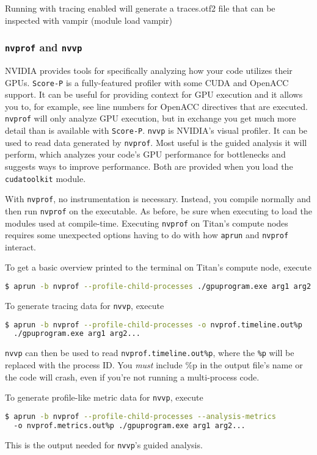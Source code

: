 Running with tracing enabled will generate a traces.otf2 file that can be
inspected with vampir (module load vampir)

\subsubsection{{\tt nvprof} and {\tt nvvp}}

NVIDIA provides tools for specifically analyzing how your code utilizes their
GPUs.  {\tt Score-P} is a fully-featured profiler with some CUDA and OpenACC
support.  It can be useful for providing context for GPU execution and it allows
you to, for example, see line numbers for OpenACC directives that are executed.
{\tt nvprof} will only analyze GPU execution, but in exchange you get much more
detail than is available with {\tt Score-P}.  {\tt nvvp} is NVIDIA's visual
profiler.  It can be used to read data generated by {\tt nvprof}.  Most useful
is the guided analysis it will perform, which analyzes your code's GPU
performance for bottlenecks and suggests ways to improve performance.  Both are
provided when you load the {\tt cudatoolkit} module.

With {\tt nvprof}, no instrumentation is necessary.  Instead, you compile
normally and then run {\tt nvprof} on the executable.  As before, be sure when
executing to load the modules used at compile-time.  Executing {\tt nvprof} on
Titan's compute nodes requires some unexpected options having to do with how
{\tt aprun} and {\tt nvprof} interact.

To get a basic overview printed to the terminal on Titan's compute node, execute
\begin{lstlisting}[language=bash,mathescape=false]
$ aprun -b nvprof --profile-child-processes ./gpuprogram.exe arg1 arg2... 
\end{lstlisting}

To generate tracing data for {\tt nvvp}, execute
\begin{lstlisting}[language=bash,mathescape=false]
$ aprun -b nvprof --profile-child-processes -o nvprof.timeline.out%p 
  ./gpuprogram.exe arg1 arg2... 
\end{lstlisting}
{\tt nvvp} can then be used to read {\tt nvprof.timeline.out\%p}, where the 
{\tt \%p} will be replaced with the process ID.  You \emph{must} include \%p in
the output file's name or the code will crash, even if you're not running a
multi-process code.

To generate profile-like metric data for {\tt nvvp}, execute
\begin{lstlisting}[language=bash,mathescape=false]
$ aprun -b nvprof --profile-child-processes --analysis-metrics 
  -o nvprof.metrics.out%p ./gpuprogram.exe arg1 arg2... 
\end{lstlisting}
This is the output needed for {\tt nvvp}'s guided analysis.

